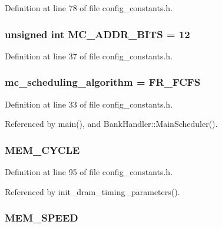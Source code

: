 Definition at line 78 of file config\_\-constants.h.
\subsubsection[{MC\_\-ADDR\_\-BITS}]{\setlength{\rightskip}{0pt plus 5cm}unsigned int {\bf MC\_\-ADDR\_\-BITS} = 12}\label{config__constants_8h_5797f7fc969d8a7c02df4ba708ed734f}




Definition at line 37 of file config\_\-constants.h.
\subsubsection[{mc\_\-scheduling\_\-algorithm}]{ {\bf mc\_\-scheduling\_\-algorithm} = FR\_\-FCFS}\label{config__constants_8h_951b5bcc078c8d83bdc41858085f4717}




Definition at line 33 of file config\_\-constants.h.

Referenced by main(), and BankHandler::MainScheduler().
\subsubsection[{MEM\_\-CYCLE}]{ {\bf MEM\_\-CYCLE}}\label{config__constants_8h_424f85d588c3ab008d093b9e9021d882}




Definition at line 95 of file config\_\-constants.h.

Referenced by init\_\-dram\_\-timing\_\-parameters().
\subsubsection[{MEM\_\-SPEED}]{ {\bf MEM\_\-SPEED}}\label{config__constants_8h_d284b4a8d7191a00227f7f1ab9ff9656}




